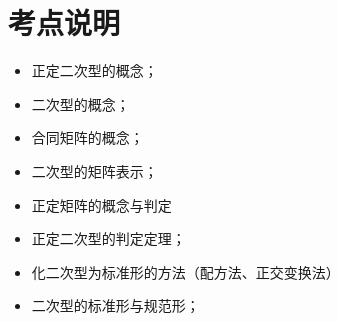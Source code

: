 \section{考点说明}
\begin{itemize}
\item 正定二次型的概念；
\item 二次型的概念；
\item 合同矩阵的概念；
\item 二次型的矩阵表示；
\item 正定矩阵的概念与判定
\item 正定二次型的判定定理；
\item 化二次型为标准形的方法（配方法、正交变换法）
\item 二次型的标准形与规范形；
\end{itemize}

